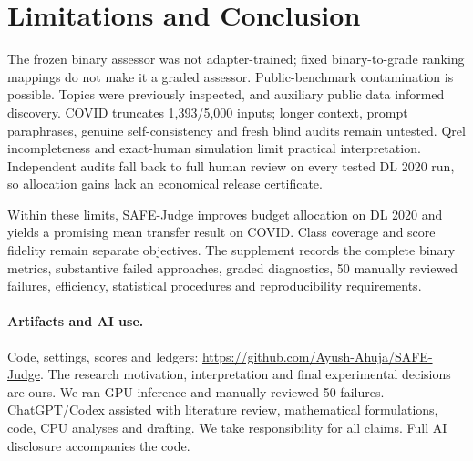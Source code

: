 \documentclass[sigconf,nonacm]{acmart}
\begin{document}
\section{Limitations and Conclusion}
The frozen binary assessor was not adapter-trained; fixed binary-to-grade
ranking mappings do not make it a graded assessor. Public-benchmark
contamination is possible. Topics were previously inspected, and auxiliary
public data informed discovery. COVID truncates 1,393/5,000 inputs; longer
context, prompt paraphrases, genuine self-consistency and fresh blind audits
remain untested. Qrel incompleteness and exact-human simulation limit practical
interpretation. Independent audits fall back to full human review on every
tested DL 2020 run, so allocation gains lack an economical release certificate.

Within these limits, SAFE-Judge improves budget allocation on DL 2020
and yields a promising mean transfer result on COVID. Class coverage and score
fidelity remain separate objectives. The supplement records the complete binary
metrics, substantive failed approaches, graded diagnostics, 50 manually reviewed
failures, efficiency, statistical procedures and reproducibility requirements.

\paragraph{Artifacts and AI use.}
Code, settings, scores and ledgers:
\url{https://github.com/Ayush-Ahuja/SAFE-Judge}.
The research motivation, interpretation and final experimental decisions are
ours. We ran GPU inference and manually reviewed 50 failures. ChatGPT/Codex
assisted with literature review, mathematical formulations, code, CPU analyses
and drafting. We take responsibility for all claims. Full AI disclosure
accompanies the code.



\end{document}
